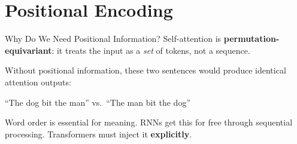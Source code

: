 \documentclass[aspectratio=169]{beamer}
\begin{document}
\section{Positional Encoding}
%
\begin{frame}{Why Do We Need Positional Information?}
  Self-attention is \textbf{permutation-equivariant}: it treats the input as a
  \emph{set} of tokens, not a sequence.

  \vspace{0.5em}
  Without positional information, these two sentences would produce identical attention
  outputs:
  \begin{center}
    ``The dog bit the man'' \quad vs.\ \quad ``The man bit the dog''
  \end{center}

  \vspace{0.4em}
  Word order is essential for meaning. RNNs get this for free through sequential
  processing.  Transformers must inject it \textbf{explicitly}.
\end{frame}
\end{document}
